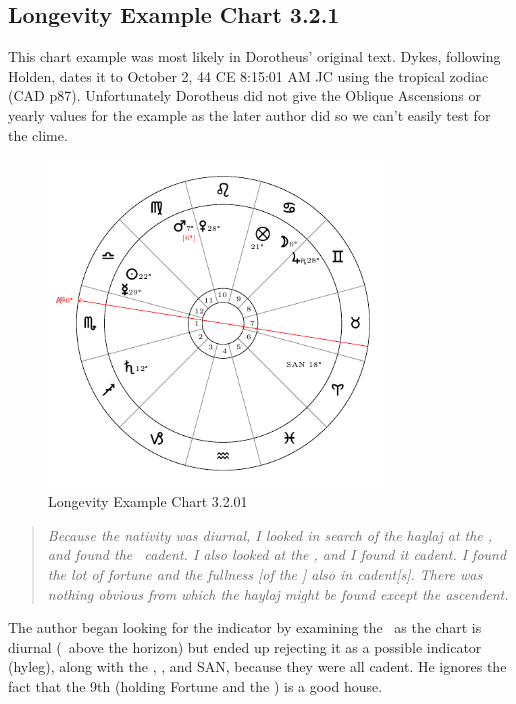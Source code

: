 \newpage
\subsection{Longevity Example Chart 3.2.1}
\vspace{0.5em}
\begin{mdframed}[backgroundcolor=cyan!5, rightmargin=1em, leftmargin=1em]
This chart example was most likely in Dorotheus' original text. Dykes, following Holden, dates it to October 2, 44 CE 8:15:01 AM JC using the tropical zodiac (CAD p87).  Unfortunately Dorotheus did not give the Oblique Ascensions or yearly values for the example as the later author did so we can't easily test for the clime.
\end{mdframed}

\begin{figure}[H]
\centering
\includegraphics[width=0.8\textwidth]{charts/3_2_01}
\vspace{-1em}
\caption{Longevity Example Chart 3.2.01}
\end{figure}

\begin{quote}
\textsl{Because the nativity was diurnal, I looked in search of the haylaj at the \Sun, and found the \Sun\, cadent. I also looked at the \Moon, and I found it cadent. I found the lot of fortune and the fullness [of the \Moon] also in cadent[s]. There was nothing obvious from which the haylaj might be found except the ascendent.}
\end{quote}

The author began looking for the indicator by examining the \Sun\, as the chart is diurnal (\Sun\, above the horizon) but ended up rejecting it as a possible indicator (hyleg), along with the \Moon, \Fortune, and SAN, because they were all cadent. He ignores the fact that the 9th (holding Fortune and the \Moon) is a good house.

